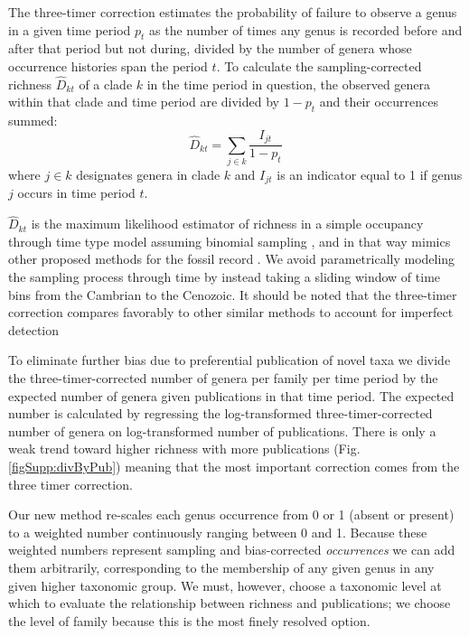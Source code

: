\documentclass[12pt]{article}
\let\citep=\cite
\begin{document}
The three-timer correction estimates the probability of failure to
observe a genus in a given time period $p_t$ as the number of times
any genus is recorded before and after that period but not during,
divided by the number of genera whose occurrence histories span the
period $t$.  To calculate the sampling-corrected richness
$\hat{D}_{kt}$ of a clade $k$ in the time period in question, the
observed genera within that clade and time period are divided by
$1 - p_t$ and their occurrences summed:
\begin{equation}
  \hat{D}_{kt} = \sum_{j \in k} \frac{I_{jt}}{1 - p_t}
\end{equation}
where $j \in k$ designates genera in clade $k$ and $I_{jt}$ is an
indicator equal to 1 if genus $j$ occurs in time period $t$.

$\hat{D}_{kt}$ is the maximum likelihood estimator of richness in a
simple occupancy through time type model assuming binomial sampling
\citep{royleDorazio}, and in that way mimics other proposed methods
for the fossil record \citep{foote2016, starrfelt2016}. We avoid
parametrically modeling the sampling process through time by instead
taking a sliding window of time bins from the Cambrian to the
Cenozoic. It should be noted that the three-timer correction compares
favorably to other similar methods to account for imperfect detection
\citep{alroy2014}

To eliminate further bias due to preferential publication of novel
taxa \citep{alroy2010} we divide the three-timer-corrected number of
genera per family per time period by the expected number of genera
given publications in that time period.  The expected number is
calculated by regressing the log-transformed three-timer-corrected
number of genera on log-transformed number of publications. There is
only a weak trend toward higher richness with more publications
(Fig. \ref{figSupp:divByPub}) meaning that the most important correction
comes from the three timer correction.

Our new method re-scales each genus occurrence from 0 or 1 (absent or
present) to a weighted number continuously ranging between 0 and
1. Because these weighted numbers represent sampling and
bias-corrected {\it occurrences} we can add them arbitrarily,
corresponding to the membership of any given genus in any given higher
taxonomic group.  We must, however, choose a taxonomic level at which
to evaluate the relationship between richness and publications; we
choose the level of family because this is the most finely resolved
option.
\end{document}
